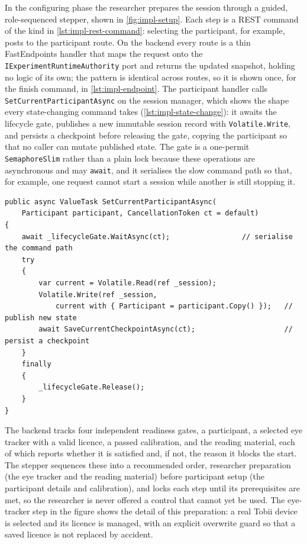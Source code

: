 In the configuring phase the researcher prepares the session through a guided, role-sequenced stepper, shown in \cref{fig:impl-setup}.
Each step is a REST command of the kind in \cref{lst:impl-rest-command}: selecting the participant, for example, posts to the participant route.
On the backend every route is a thin FastEndpoints handler that maps the request onto the \texttt{IExperimentRuntimeAuthority} port and returns the updated snapshot, holding no logic of its own; the pattern is identical across routes, so it is shown once, for the finish command, in \cref{lst:impl-endpoint}.
The participant handler calls \texttt{SetCurrentParticipantAsync} on the session manager, which shows the shape every state-changing command takes (\cref{lst:impl-state-change}): it awaits the lifecycle gate, publishes a new immutable session record with \texttt{Volatile.Write}, and persists a checkpoint before releasing the gate, copying the participant so that no caller can mutate published state.
The gate is a one-permit \texttt{SemaphoreSlim} rather than a plain lock because these operations are asynchronous and may \texttt{await}, and it serialises the slow command path so that, for example, one request cannot start a session while another is still stopping it.

\begin{listing}[htbp]
\begin{verbatim}
public async ValueTask SetCurrentParticipantAsync(
    Participant participant, CancellationToken ct = default)
{
    await _lifecycleGate.WaitAsync(ct);                 // serialise the command path
    try
    {
        var current = Volatile.Read(ref _session);
        Volatile.Write(ref _session,
            current with { Participant = participant.Copy() });   // publish new state
        await SaveCurrentCheckpointAsync(ct);                     // persist a checkpoint
    }
    finally
    {
        _lifecycleGate.Release();
    }
}
\end{verbatim}
\caption{Template for every state-changing command (from \texttt{ExperimentSessionManager.Lifecycle.cs}).}
\label{lst:impl-state-change}
\end{listing}

The backend tracks four independent readiness gates, a participant, a selected eye tracker with a valid licence, a passed calibration, and the reading material, each of which reports whether it is satisfied and, if not, the reason it blocks the start.
The stepper sequences these into a recommended order, researcher preparation (the eye tracker and the reading material) before participant setup (the participant details and calibration), and locks each step until its prerequisites are met, so the researcher is never offered a control that cannot yet be used.
The eye-tracker step in the figure shows the detail of this preparation: a real Tobii device is selected and its licence is managed, with an explicit overwrite guard so that a saved licence is not replaced by accident.


